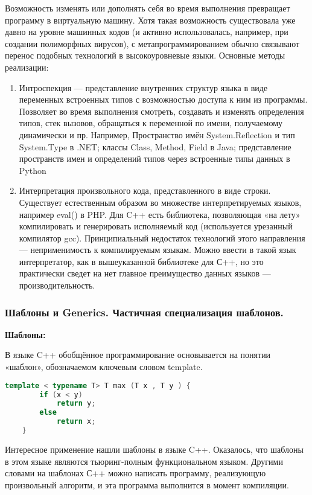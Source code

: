 \documentclass{article}
\begin{document}
Возможность изменять или дополнять себя во время выполнения превращает программу в виртуальную машину. Хотя такая возможность существовала уже давно на уровне машинных кодов (и активно использовалась, например, при создании полиморфных вирусов), с метапрограммированием обычно связывают перенос подобных технологий в высокоуровневые языки. Основные методы реализации:
\begin{enumerate}
	\item Интроспекция — представление внутренних структур языка в виде переменных встроенных типов с возможностью доступа к ним из программы. Позволяет во время выполнения смотреть, создавать и изменять определения типов, стек вызовов, обращаться к переменной по имени, получаемому динамически и пр.
	Например, Пространство имён System.Reflection и тип System.Type в .NET; классы Class, Method, Field в Java; представление пространств имен и определений типов через встроенные типы данных в Python
	\item  Интерпретация произвольного кода, представленного в виде строки.
	Существует естественным образом во множестве интерпретируемых языков, например eval() в PHP.
	Для C++ есть библиотека, позволяющая «на лету» компилировать и генерировать исполняемый код (используется урезанный компилятор gcc).
	Принципиальный недостаток технологий этого направления — неприменимость к компилируемым языкам. Можно ввести в такой язык интерпретатор, как в вышеуказанной библиотеке для С++, но это
	практически сведет на нет главное преимущество данных языков — производительность.
\end{enumerate}

\subsubsection{Шаблоны и Generics. Частичная специализация шаблонов.}

\textbf{Шаблоны:}

В языке C++ обобщённое программирование основывается на понятии «шаблон», обозначаемом ключевым словом template.

\begin{lstlisting}[language=C++]
	template < typename T> T max (T x , T y ) {
		if (x < y)
			return y;
		else
			return x;
	}
\end{lstlisting}

Интересное применение нашли шаблоны в языке C++. Оказалось, что шаблоны в этом языке являются тьюринг-полным функциональном языком. Другими словами на шаблонах С++ можно написать программу, реализующую произвольный алгоритм, и эта программа выполнится в момент компиляции.
\end{document}
